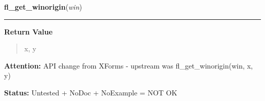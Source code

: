     \label{xformslib:library:fl_get_winorigin}

    \vspace{0.5ex}

\hspace{.8\funcindent}\begin{boxedminipage}{\funcwidth}

    \raggedright \textbf{fl\_get\_winorigin}(\textit{win})

    \vspace{-1.5ex}

    \rule{\textwidth}{0.5\fboxrule}
\setlength{\parskip}{2ex}
\setlength{\parskip}{1ex}
      \textbf{Return Value}
    \vspace{-1ex}

      \begin{quote}
      x, y

      \end{quote}

\textbf{Attention:} API change from XForms - upstream was fl\_get\_winorigin(win, x, y)



\textbf{Status:} Untested + NoDoc + NoExample = NOT OK



    \end{boxedminipage}

    \label{xformslib:library:fl_get_wingeometry}

    \vspace{0.5ex}


